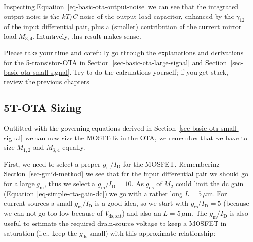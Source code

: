 \documentclass[
  a4paper,
  DIV=11,
  numbers=noendperiod]{scrartcl}
\begin{document}
Inspecting Equation~\ref{eq-basic-ota-output-noise} we can see that the
integrated output noise is the \(k T / C\) noise of the output load
capacitor, enhanced by the \(\gamma_{12}\) of the input differential
pair, plus a (smaller) contribution of the current mirror load
\(M_{3,4}\). Intuitively, this result makes sense.

\begin{tcolorbox}[enhanced jigsaw, titlerule=0mm, left=2mm, coltitle=black, toprule=.15mm, breakable, opacitybacktitle=0.6, colframe=quarto-callout-tip-color-frame, bottomtitle=1mm, toptitle=1mm, opacityback=0, colbacktitle=quarto-callout-tip-color!10!white, title=\textcolor{quarto-callout-tip-color}{\faLightbulb}\hspace{0.5em}{Exercise: Derivation of 5T-OTA Performance}, arc=.35mm, rightrule=.15mm, colback=white, bottomrule=.15mm, leftrule=.75mm]

Please take your time and carefully go through the explanations and
derivations for the 5-transistor-OTA in
Section~\ref{sec-basic-ota-large-signal} and
Section~\ref{sec-basic-ota-small-signal}. Try to do the calculations
yourself; if you get stuck, review the previous chapters.

\end{tcolorbox}

\subsection{5T-OTA Sizing}\label{sec-basic-ota-sizing}

Outfitted with the governing equations derived in
Section~\ref{sec-basic-ota-small-signal} we can now size the MOSFETs in
the OTA, we remember that we have to size \(M_{1,2}\) and \(M_{3,4}\)
equally.

First, we need to select a proper \(g_\mathrm{m}/I_\mathrm{D}\) for the
MOSFET. Remembering Section~\ref{sec-gmid-method} we see that for the
input differential pair we should go for a large \(g_\mathrm{m}\), thus
we select a \(g_\mathrm{m}/I_\mathrm{D}= 10\). As \(g_\mathrm{ds}\) of
\(M_2\) could limit the dc gain (Equation~\ref{eq-simple-ota-gain-dc})
we go with a rather long \(L = 5\,\mu\text{m}\). For current sources a
small \(g_\mathrm{m}/I_\mathrm{D}\) is a good idea, so we start with
\(g_\mathrm{m}/I_\mathrm{D}=5\) (because we can not go too low because
of \(V_\mathrm{ds,sat}\)) and also an \(L = 5\,\mu\text{m}\). The
\(g_\mathrm{m}/I_\mathrm{D}\) is also useful to estimate the required
drain-source voltage to keep a MOSFET in saturation (i.e., keep the
\(g_\mathrm{ds}\) small) with this approximate relationship:
\end{document}
